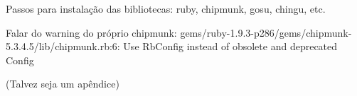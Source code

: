 Passos para instalação das bibliotecas: ruby, chipmunk, gosu, chingu, etc.

Falar do warning do próprio chipmunk:
gems/ruby-1.9.3-p286/gems/chipmunk-5.3.4.5/lib/chipmunk.rb:6: Use RbConfig instead of obsolete and deprecated Config

(Talvez seja um apêndice)
